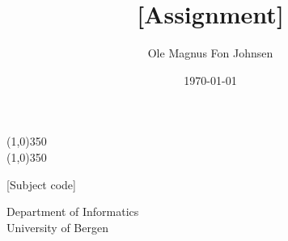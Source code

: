 \documentclass[12pt]{article}
\title{[Assignment]}
\author{Ole Magnus Fon Johnsen}
\date{\today}
\begin{document}
    \begin{titlepage}
        \centering

        \line(1,0){350} \\
        \Huge{\textbf{\thetitle}}
        \line(1,0){350}

        \vspace{0.5cm}
        [Subject code]

        \vspace{1.5cm}

        \Large{\textbf{\theauthor}}

        \vfill
        \vspace{0.8cm}


        Department of Informatics\\
        University of Bergen\\
        \thedate
    \end{titlepage}

    \tableofcontents

    
    

    \nocite{*}
    
\end{document}
